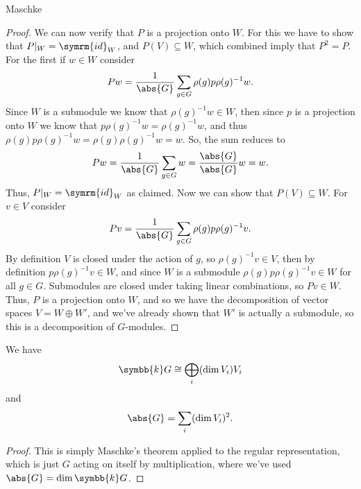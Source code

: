 \documentclass[fleqn]{NotesClass}
\renewcommand{\field}{\symbb{k}}
\newcommand{\id}{\symrm{id}}
\newcommand{\isomorphic}{\cong}
\begin{document}
\begin{thm}{Maschke}{}
\begin{proof}
            We can now verify that \(P\) is a projection onto \(W\).
            For this we have to show that \(P|_W = \id_W\), and \(P(V) \subseteq W\), which combined imply that \(P^2 = P\).
            For the first if \(w \in W\) consider
            \begin{equation}
                Pw = \frac{1}{\abs{G}} \sum_{g \in G} \rho(g) p \rho(g)^{-1}w.
            \end{equation}
            Since \(W\) is a submodule we know that \(\rho(g)^{-1}w \in W\), then since \(p\) is a projection onto \(W\) we know that \(p\rho(g)^{-1}w = \rho(g)^{-1}w\), and thus \(\rho(g)p\rho(g)^{-1}w = \rho(g)\rho(g)^{-1}w = w\).
            So, the sum reduces to
            \begin{equation}
                Pw = \frac{1}{\abs{G}} \sum_{g \in G} w = \frac{\abs{G}}{\abs{G}} w = w.
            \end{equation}
            Thus, \(P|_W = \id_W\) as claimed.
            Now we can show that \(P(V) \subseteq W\).
            For \(v \in V\) consider
            \begin{equation}
                Pv = \frac{1}{\abs{G}} \sum_{g \in G} \rho(g) p \rho(g)^{-1}v.
            \end{equation}
            By definition \(V\) is closed under the action of \(g\), so \(\rho(g)^{-1}v \in V\), then by definition \(p \rho(g)^{-1} v \in W\), and since \(W\) is a submodule \(\rho(g)p\rho(g)^{-1} v \in W\) for all \(g \in G\).
            Submodules are closed under taking linear combinations, so \(Pv \in W\).
            Thus, \(P\) is a projection onto \(W\), and so we have the decomposition of vector spaces \(V = W \oplus W'\), and we've already shown that \(W'\) is actually a submodule, so this is a decomposition of \(G\)-modules.
        \end{proof}
    \end{thm}
    
    \begin{crl}{}{}
        We have
        \begin{equation}
            \field G \isomorphic \bigoplus_i (\dim V_i) V_i
        \end{equation}
        and
        \begin{equation}
            \abs{G} = \sum_i (\dim V_i)^2.
        \end{equation}
        \begin{proof}
            This is simply Maschke's theorem applied to the regular representation, which is just \(G\) acting on itself by multiplication, where we've used \(\abs{G} = \dim \field G\).
        \end{proof}
    \end{crl}
    
\end{document}
